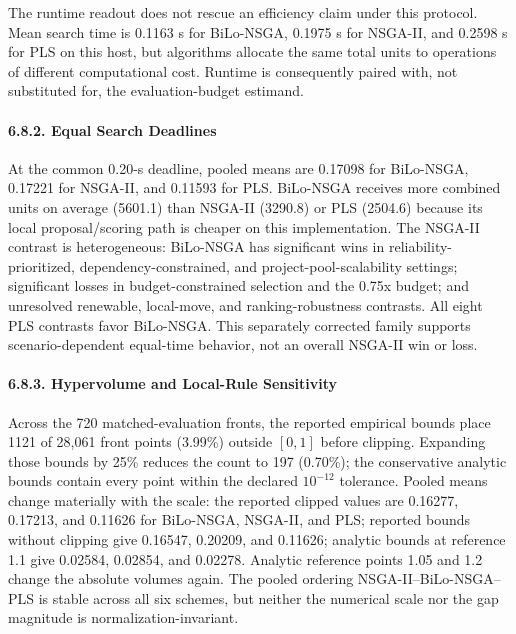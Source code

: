 \documentclass[
]{article}
\begin{document}
The runtime readout does not rescue an efficiency claim under this protocol. Mean search time is 0.1163 s for BiLo-NSGA, 0.1975 s for NSGA-II, and 0.2598 s for PLS on this host, but algorithms allocate the same total units to operations of different computational cost. Runtime is consequently paired with, not substituted for, the evaluation-budget estimand.

\paragraph{6.8.2. Equal Search Deadlines}\label{equal-search-deadlines}

At the common 0.20-s deadline, pooled means are 0.17098 for BiLo-NSGA, 0.17221 for NSGA-II, and 0.11593 for PLS. BiLo-NSGA receives more combined units on average (5601.1) than NSGA-II (3290.8) or PLS (2504.6) because its local proposal/scoring path is cheaper on this implementation. The NSGA-II contrast is heterogeneous: BiLo-NSGA has significant wins in reliability-prioritized, dependency-constrained, and project-pool-scalability settings; significant losses in budget-constrained selection and the 0.75x budget; and unresolved renewable, local-move, and ranking-robustness contrasts. All eight PLS contrasts favor BiLo-NSGA. This separately corrected family supports scenario-dependent equal-time behavior, not an overall NSGA-II win or loss.

\paragraph{6.8.3. Hypervolume and Local-Rule Sensitivity}\label{hypervolume-and-local-rule-sensitivity}

Across the 720 matched-evaluation fronts, the reported empirical bounds place 1121 of 28,061 front points (3.99\%) outside \([0,1]\) before clipping. Expanding those bounds by 25\% reduces the count to 197 (0.70\%); the conservative analytic bounds contain every point within the declared \(10^{-12}\) tolerance. Pooled means change materially with the scale: the reported clipped values are 0.16277, 0.17213, and 0.11626 for BiLo-NSGA, NSGA-II, and PLS; reported bounds without clipping give 0.16547, 0.20209, and 0.11626; analytic bounds at reference 1.1 give 0.02584, 0.02854, and 0.02278. Analytic reference points 1.05 and 1.2 change the absolute volumes again. The pooled ordering NSGA-II--BiLo-NSGA--PLS is stable across all six schemes, but neither the numerical scale nor the gap magnitude is normalization-invariant.
\end{document}
